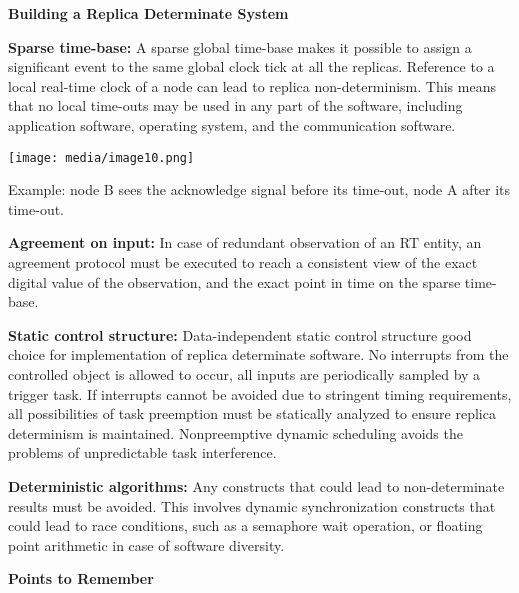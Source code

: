 \textbf{Building a Replica Determinate System}

\textbf{Sparse time-base:} A sparse global time-base makes it possible
to assign a significant event to the same global clock tick at all the
replicas. Reference to a local real-time clock of a node can lead to
replica non-determinism. This means that no local time-outs may be used
in any part of the software, including application software, operating
system, and the communication software.

\texttt{[image: media/image10.png]}

Example: node B sees the acknowledge signal before its time-out, node A
after its time-out.

\textbf{Agreement on input:} In case of redundant observation of an RT
entity, an agreement protocol must be executed to reach a consistent
view of the exact digital value of the observation, and the exact point
in time on the sparse time-base.

\textbf{Static control structure:} Data-independent static control
structure good choice for implementation of replica determinate
software. No interrupts from the controlled object is allowed to occur,
all inputs are periodically sampled by a trigger task. If interrupts
cannot be avoided due to stringent timing requirements, all
possibilities of task preemption must be statically analyzed to ensure
replica determinism is maintained. Nonpreemptive dynamic scheduling
avoids the problems of unpredictable task interference.

\textbf{Deterministic algorithms:} Any constructs that could lead to
non-determinate results must be avoided. This involves dynamic
synchronization constructs that could lead to race conditions, such as a
semaphore wait operation, or floating point arithmetic in case of
software diversity.

\protect\hypertarget{teil8}{}{}\textbf{Points to Remember}
